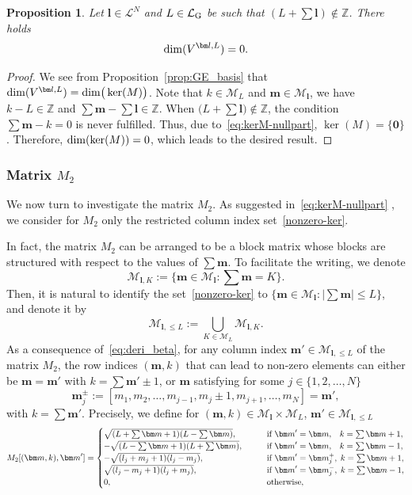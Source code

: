 \documentclass{article}
\newcommand{\dimge}[2]{\dim(V^{#1,#2})}
\newtheorem{proposition}[theorem]{Proposition}
\numberwithin{equation}{section}
\def\Z{\mathbb{Z}}
\def\bl{{\bm l}}
\def\bbm{{\bm m}}
\def\calM{\mathcal{M}}
\def\calL{\mathcal{L}}
\def\calLG{\mathcal{\calL_{\rm G}}}
\def\MlL{{M}}
\def\dim{{{\rm dim}}}
\begin{document}
{\begin{proposition}
Let $\bl\in\calL^N$ and $L \in \calLG$  be such that $(L+\sum\bl)\notin\Z$. There holds
\[ 
    \dimge{\bl}{L} = 0.
\]
\end{proposition}

\begin{proof}
We see from Proposition~\ref{prop:GE_basis} that $\dimge{\bl}{L} = \dim\big(\ker(\MlL)\big)$. 
Note that $k\in\calM_L$ and $\bbm\in\calM_\bl$, we have $k-L\in\Z$ and $\sum\bbm-\sum\bl\in\Z$. When $\big(L+\sum\bl\big)\notin\Z$, the condition $\sum\bbm - k = 0$ is never fulfilled. Thus, due to~\eqref{eq:kerM-nullpart}, $\ker(\MlL)=\{\mathbf{0}\}$. Therefore, $\dim(\ker(\MlL))=0$, which leads to the desired result. 
\end{proof}

\subsubsection{Matrix $\MlL_2$}

We now turn to investigate the matrix $\MlL_2$. 
As suggested in~\eqref{eq:kerM-nullpart} , we consider for $\MlL_2$ only the restricted column index set~\eqref{nonzero-ker}.} In fact, the matrix $\MlL_2$ can be arranged to be a block matrix whose blocks are structured with respect to the values of $\sum \bbm$. To facilitate the writing, we denote
\begin{equation}
\label{eq:calMK}
       \calM_{\bl,K} := \{\bbm\in\calM_\bl:\sum\bbm=K\}.
\end{equation}
Then, it is natural to identify the set~\eqref{nonzero-ker} to $\Big\{\bbm\in\calM_\bl:|\sum\bbm|\le L
\Big\}$, and denote it by
\[
     \calM_{\bl,\le L} := \bigcup_{K\in\calM_L}\calM_{\bl,K}.
\]
As a consequence of~\eqref{eq:deri_beta}, for any column index $\bbm'\in\calM_{\bl,\le L}$ of the matrix $\MlL_2$, the row indices $(\bbm,k)$ that can lead to non-zero elements can either be $\bbm=\bbm'$ with $k = \sum \bbm' \pm 1$, or $\bbm$ satisfying for some $j\in\{1,2,\ldots,N\}$
\[
    \bbm^{\pm}_j := [m_1,m_2,\ldots,m_{j-1},m_j\pm1,m_{j+1},\ldots,m_N]=\bbm',
\]
with $k=\sum\bbm'$.
Precisely, we define for $(\bbm,k)\in \calM_\bl\times\calM_L$, $\bbm'\in \calM_{\bl,\le L}$
\begin{equation}
        \MlL_2[(\bbm,k),\bbm'] = 
    \begin{cases}
        \sqrt{(L+\sum\bbm+1)(L-\sum\bbm)}, & \qquad  \textup{if }\bbm'=\bbm,\;\;\; k = \sum\bbm+1, \\
        -\sqrt{(L-\sum\bbm+1)(L+\sum\bbm)}, & \qquad  \textup{if }\bbm'=\bbm,\;\;\; k = \sum\bbm-1, \\
        -\sqrt{(l_j+m_j+1)(l_j-m_j)}, & \qquad \textup{if }\bbm' = \bbm_j^+, \; k = \sum\bbm+1, \\
        \sqrt{(l_j-m_j+1)(l_j+m_j)}, & \qquad \textup{if }\bbm' = \bbm_j^-, \; k = \sum\bbm-1, \\
        0, & \qquad \textup{otherwise},
    \end{cases}
    \label{eq:M2}
\end{equation}
\end{document}
